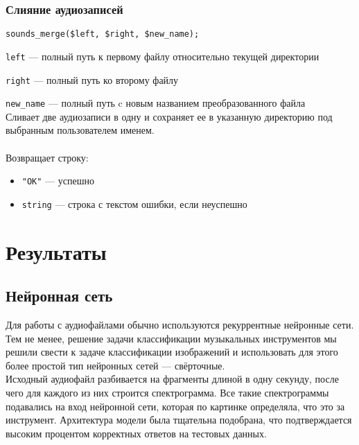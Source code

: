 \documentclass[14pt,a4paper]{article}
\begin{document}
\subsubsection*{Слияние аудиозаписей}

\begin{lstlisting}
sounds_merge($left, $right, $new_name);
\end{lstlisting}

\lstinline{left} --- полный путь к первому файлу относительно текущей директории \par
\lstinline{right} --- полный путь ко второму файлу \par
\lstinline{new_name} --- полный путь c новым названием преобразованного файла \\

\noindent Сливает две аудиозаписи в одну и сохраняет ее в указанную директорию под выбранным пользователем именем. \\\\
Возвращает строку:
\smallskip
\begin{itemize}
\item \lstinline{"OK"} --- успешно
\item \lstinline{string} --- строка с текстом ошибки, если неуспешно
\end{itemize}

\newpage

\section[Результаты]{\huge Результаты}

\subsection{Нейронная сеть}

Для работы с аудиофайлами обычно используются рекуррентные нейронные сети. Тем не менее, решение задачи классификации музыкальных инструментов мы решили свести к задаче классификации изображений и использовать для этого более простой тип нейронных сетей — свёрточные. \\

Исходный аудиофайл разбивается на фрагменты длиной в одну секунду, после чего для каждого из них строится спектрограмма. Все такие спектрограммы подавались на вход нейронной сети, которая по картинке определяла, что это за инструмент. Архитектура модели была тщательна подобрана, что подтверждается высоким процентом корректных ответов на тестовых данных.


\end{document}
